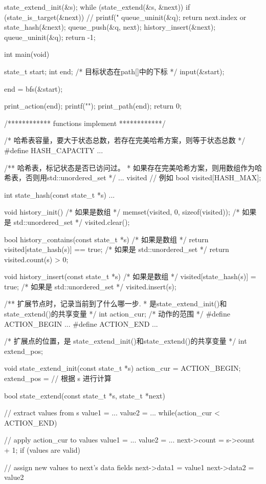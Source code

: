 \begin{Codex}[label=bfs_template.c]
{{        state_extend_init(&s);
        while (state_extend(&s, &next)) {
            if (state_is_target(&next)) {
                // printf("%
                queue_uninit(&q);
                return next.index or state_hash(&next);
            }
            queue_push(&q, next);
            history_insert(&next);
        }
    }
    queue_uninit(&q);
    return -1;
}

int main(void) {
    state_t start;
    int end; /* 目标状态在path[]中的下标 */
    input(&start);

    end = bfs(&start);

    print_action(end);
    printf("\n");
    print_path(end);
    return 0;
}

/************ functions implement ************/

/* 哈希表容量，要大于状态总数，若存在完美哈希方案，则等于状态总数 */
#define HASH_CAPACITY ...

/** 哈希表，标记状态是否已访问过。
 * 如果存在完美哈希方案，则用数组作为哈希表，否则用std::unordered_set
 */
... visited
// 例如 bool visited[HASH_MAX];

int state_hash(const state_t *s) {
    ...
}

void history_init() {
    /* 如果是数组 */
    memset(visited, 0, sizeof(visited));
    /* 如果是 std::unordered_set */
    visited.clear();
}

bool history_contains(const state_t *s) {
    /* 如果是数组 */
    return visited[state_hash(s)] == true;
    /* 如果是 std::unordered_set */
    return visited.count(s) > 0;
}

void history_insert(const state_t *s) {
    /* 如果是数组 */
    visited[state_hash(s)] = true;
    /* 如果是 std::unordered_set */
    visited.insert(s);
}

/** 扩展节点时，记录当前到了什么哪一步.
 * 是state_extend_init()和state_extend()的共享变量
 */
int action_cur;
/* 动作的范围 */
#define ACTION_BEGIN ...
#define ACTION_END ...

/* 扩展点的位置，是 state_extend_init()和state_extend()的共享变量 */
int extend_pos;

void state_extend_init(const state_t *s) {
    action_cur = ACTION_BEGIN;
    extend_pos = // 根据 s 进行计算
}

bool state_extend(const state_t *s, state_t *next) {
    // extract values from s
    value1 = ...
    value2 = ...
    while(action_cur < ACTION_END) {
        // apply action_cur to values
        value1 = ...
        value2 = ...
        next->count = s->count + 1;
        if (values are valid) {
            // assign new values to next's data fields
            next->data1 = value1
            next->data2 = value2

}}}
\end{Codex}
